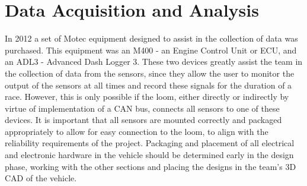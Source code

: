 %
%

\section{Data Acquisition and Analysis}
In 2012 a set of Motec equipment designed to assist in the collection of data was purchased. This equipment was an M400 - an Engine Control Unit or ECU, and an ADL3 - Advanced Dash Logger 3. These two devices greatly assist the team in the collection of data from the sensors, since they allow the user to monitor the output of the sensors at all times and record these signals for the duration of a race. However, this is only possible if the loom, either directly or indirectly by virtue of implementation of a CAN bus, connects all sensors to one of these devices. It is important that all sensors are mounted correctly and packaged appropriately to allow for easy connection to the loom, to align with the reliability requirements of the project. Packaging and placement of all electrical and electronic hardware in the vehicle should be determined early in the design phase, working with the other sections and placing the designs in the team's 3D CAD of the vehicle.

